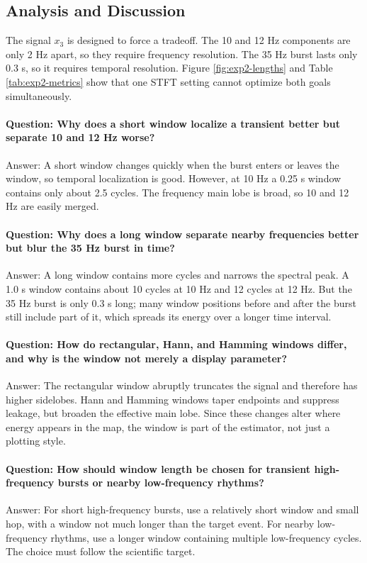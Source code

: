 \documentclass[a4paper,11pt]{article}
\numberwithin{equation}{section}
\begin{document}
\subsection{Analysis and Discussion}
The signal $x_3$ is designed to force a tradeoff. The 10 and 12 Hz components are only 2 Hz apart, so they require frequency resolution. The 35 Hz burst lasts only 0.3 s, so it requires temporal resolution. Figure \ref{fig:exp2-lengths} and Table \ref{tab:exp2-metrics} show that one STFT setting cannot optimize both goals simultaneously.

\paragraph{Question: Why does a short window localize a transient better but separate 10 and 12 Hz worse?}
Answer: A short window changes quickly when the burst enters or leaves the window, so temporal localization is good. However, at 10 Hz a 0.25 s window contains only about 2.5 cycles. The frequency main lobe is broad, so 10 and 12 Hz are easily merged.

\paragraph{Question: Why does a long window separate nearby frequencies better but blur the 35 Hz burst in time?}
Answer: A long window contains more cycles and narrows the spectral peak. A 1.0 s window contains about 10 cycles at 10 Hz and 12 cycles at 12 Hz. But the 35 Hz burst is only 0.3 s long; many window positions before and after the burst still include part of it, which spreads its energy over a longer time interval.

\paragraph{Question: How do rectangular, Hann, and Hamming windows differ, and why is the window not merely a display parameter?}
Answer: The rectangular window abruptly truncates the signal and therefore has higher sidelobes. Hann and Hamming windows taper endpoints and suppress leakage, but broaden the effective main lobe. Since these changes alter where energy appears in the map, the window is part of the estimator, not just a plotting style.

\paragraph{Question: How should window length be chosen for transient high-frequency bursts or nearby low-frequency rhythms?}
Answer: For short high-frequency bursts, use a relatively short window and small hop, with a window not much longer than the target event. For nearby low-frequency rhythms, use a longer window containing multiple low-frequency cycles. The choice must follow the scientific target.
\end{document}
